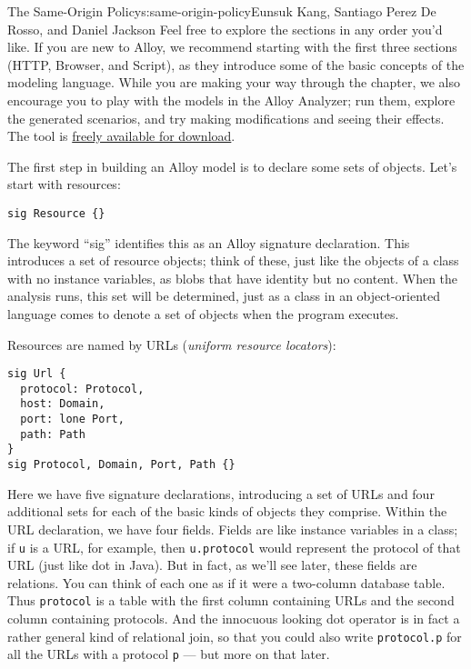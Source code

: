 \begin{aosachapter}{The Same-Origin Policy}{s:same-origin-policy}{Eunsuk Kang, Santiago Perez De Rosso, and Daniel Jackson}
Feel free to explore the sections in any order you'd like. If you are
new to Alloy, we recommend starting with the first three sections (HTTP,
Browser, and Script), as they introduce some of the basic concepts of
the modeling language. While you are making your way through the
chapter, we also encourage you to play with the models in the Alloy
Analyzer; run them, explore the generated scenarios, and try making
modifications and seeing their effects. The tool is
\href{http://alloy.mit.edu}{freely available for download}.

\label{model-of-the-web}

\label{http}

The first step in building an Alloy model is to declare some sets of
objects. Let's start with resources:

\begin{verbatim}
sig Resource {}
\end{verbatim}

The keyword ``sig'' identifies this as an Alloy signature declaration.
This introduces a set of resource objects; think of these, just like the
objects of a class with no instance variables, as blobs that have
identity but no content. When the analysis runs, this set will be
determined, just as a class in an object-oriented language comes to
denote a set of objects when the program executes.

Resources are named by URLs (\emph{uniform resource locators}):

\begin{verbatim}
sig Url {
  protocol: Protocol,
  host: Domain,
  port: lone Port,
  path: Path
}
sig Protocol, Domain, Port, Path {}
\end{verbatim}

Here we have five signature declarations, introducing a set of URLs and
four additional sets for each of the basic kinds of objects they
comprise. Within the URL declaration, we have four fields. Fields are
like instance variables in a class; if \texttt{u} is a URL, for example,
then \texttt{u.protocol} would represent the protocol of that URL (just
like dot in Java). But in fact, as we'll see later, these fields are
relations. You can think of each one as if it were a two-column database
table. Thus \texttt{protocol} is a table with the first column
containing URLs and the second column containing protocols. And the
innocuous looking dot operator is in fact a rather general kind of
relational join, so that you could also write \texttt{protocol.p} for
all the URLs with a protocol \texttt{p} --- but more on that later.


\end{aosachapter}
